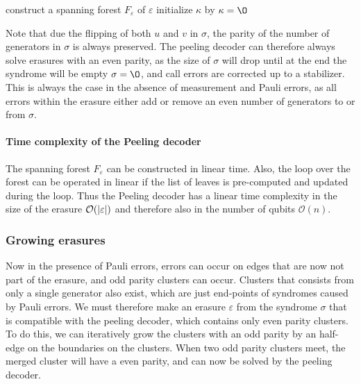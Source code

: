 \begin{algo}[algotitle=Peeling decoder \cite{delfosse2017}, label=algo:peel]
\begin{algorithm}[H]
    \SetAlgoNoEnd
    \BlankLine
    construct a spanning forest $F_\varepsilon$ of $\varepsilon$\;
    initialize $\kappa$ by $\kappa = {\O}$\;
    \KwRet{$\kappa$}
\end{algorithm}
\end{algo}

\noindent Note that due the flipping of both $u$ and $v$ in $\sigma$, the parity of the number of generators in $\sigma$ is always preserved. The peeling decoder can therefore always solve erasures with an even parity, as the size of $\sigma$ will drop until at the end the syndrome will be empty $\sigma = \O$, and call errors are corrected up to a stabilizer. This is always the case in the absence of measurement and Pauli errors, as all errors within the erasure either add or remove an even number of generators to or from $\sigma$.

\paragraph{Time complexity of the Peeling decoder}
The spanning forest $F_\varepsilon$ can be constructed in linear time. Also, the loop over the forest can be operated in linear if the list of leaves is pre-computed and updated during the loop. Thus the Peeling decoder has a linear time complexity in the size of the erasure $\mathcal{O}(\abs{\varepsilon})$ and therefore also in the number of qubits $\mathcal{O}(n)$.

\subsubsection{Growing erasures}

Now in the presence of Pauli errors, errors can occur on edges that are now not part of the erasure, and odd parity clusters can occur. Clusters that consists from only a single generator also exist, which are just end-points of syndromes caused by Pauli errors. We must therefore make an erasure $\varepsilon$ from the syndrome $\sigma$ that is compatible with the peeling decoder, which contains only even parity clusters. To do this, we can iteratively grow the clusters with an odd parity by an half-edge on the boundaries on the clusters. When two odd parity clusters meet, the merged cluster will have a even parity, and can now be solved by the peeling decoder.


